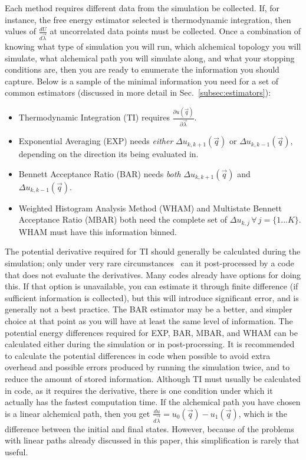 \documentclass[9pt,bestpractices]{livecoms}
\begin{document}
Each method requires different data from the simulation be collected. If, for instance, the free energy estimator selected is thermodynamic integration, then values of $\frac{dU}{d\vec{\lambda}}$ at uncorrelated data points must be collected. Once a combination of knowing what type of simulation you will run, which alchemical topology you will simulate, what alchemical path you will simulate along, and what your stopping conditions are, then you are ready to enumerate the information you should capture. Below is a sample of the minimal information you need for a set of common estimators (discussed in more detail in Sec.~\ref{subsec:estimators}):

\begin{itemize}
    \item Thermodynamic Integration (TI) requires $\frac{\partial u(\vec{q})}{\partial\vec{\lambda}}$.
    \item Exponential Averaging (EXP) needs \textit{either} $\Delta u_{k,k+1}(\vec{q})$ or $\Delta u_{k,k-1}(\vec{q})$, depending on the direction its being evaluated in.
    \item Bennett Acceptance Ratio (BAR) needs \textit{both} $\Delta u_{k,k+1}(\vec{q})$ and $\Delta u_{k,k-1}(\vec{q})$.
    \item Weighted Histogram Analysis Method (WHAM) and Multistate Bennett Acceptance Ratio (MBAR) both need the complete set of $\Delta u_{k,j} \, \forall \, j=\{1...K\}$. WHAM must have this information binned.
\end{itemize}

The potential derivative required for TI should generally be calculated during the simulation; only under very rare circumstances~\cite{naden2015linear} can it post-processed by a code that does not evaluate the derivatives. Many codes already have options for doing this.
If that option is unavailable, you can estimate it through finite difference (if sufficient information is collected), but this will introduce significant error, and is generally not a best practice. The BAR estimator may be a better, and simpler choice at that point as you will have at least the same level of information. 
The potential energy differences required for EXP, BAR, MBAR, and WHAM can be calculated either during the simulation or in post-processing. It is recommended to calculate the potential differences in code when possible to avoid extra overhead and possible errors produced by running the simulation twice, and to reduce the amount of stored information. 
Although TI must usually be calculated in code, as it requires the derivative, there is one condition under which it actually has the fastest computation time. 
If the alchemical path you have chosen is a linear alchemical path, then you get $\frac{du}{d\vec{\lambda}} = u_0(\vec{q}) - u_1(\vec{q})$, which is the difference between the initial and final states. 
However, because of the problems with linear paths already discussed in this paper, this simplification is rarely that useful.
\end{document}
